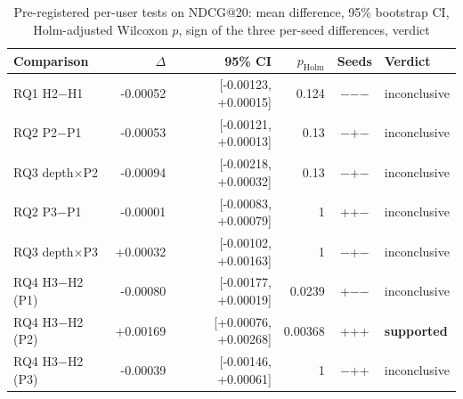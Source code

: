 \begin{table}[H]
\centering
\small
\begin{tabular}{lrrrcl}
\toprule
Comparison & $\Delta$ & 95\% CI & $p_{\text{Holm}}$ & Seeds & Verdict \\
\midrule
RQ1 H2$-$H1 & -0.00052 & [-0.00123, +0.00015] & 0.124 & $-$$-$$-$ & inconclusive \\
RQ2 P2$-$P1 & -0.00053 & [-0.00121, +0.00013] & 0.13 & $-$+$-$ & inconclusive \\
RQ3 depth$\times$P2 & -0.00094 & [-0.00218, +0.00032] & 0.13 & $-$+$-$ & inconclusive \\
RQ2 P3$-$P1 & -0.00001 & [-0.00083, +0.00079] & 1 & ++$-$ & inconclusive \\
RQ3 depth$\times$P3 & +0.00032 & [-0.00102, +0.00163] & 1 & $-$+$-$ & inconclusive \\
RQ4 H3$-$H2 (P1) & -0.00080 & [-0.00177, +0.00019] & 0.0239 & +$-$$-$ & inconclusive \\
RQ4 H3$-$H2 (P2) & +0.00169 & [+0.00076, +0.00268] & 0.00368 & +++ & \textbf{supported} \\
RQ4 H3$-$H2 (P3) & -0.00039 & [-0.00146, +0.00061] & 1 & $-$++ & inconclusive \\
\bottomrule
\end{tabular}
\caption{Pre-registered per-user tests on NDCG@20: mean difference, 95\% bootstrap CI, Holm-adjusted Wilcoxon $p$, sign of the three per-seed differences, verdict\RunTag}
\label{tab:significance}
\end{table}
